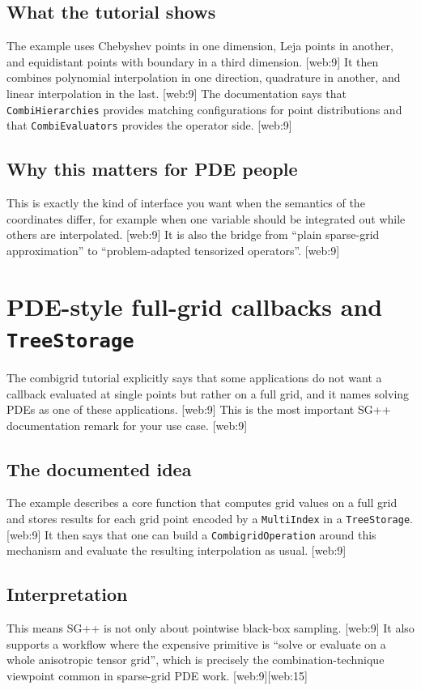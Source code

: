\documentclass[11pt,a4paper]{article}
\begin{document}
\subsection{What the tutorial shows}
The example uses Chebyshev points in one dimension, Leja points in another, and equidistant points with boundary in a third dimension. [web:9]  
It then combines polynomial interpolation in one direction, quadrature in another, and linear interpolation in the last. [web:9]  
The documentation says that \texttt{CombiHierarchies} provides matching configurations for point distributions and that \texttt{CombiEvaluators} provides the operator side. [web:9]  

\subsection{Why this matters for PDE people}
This is exactly the kind of interface you want when the semantics of the coordinates differ, for example when one variable should be integrated out while others are interpolated. [web:9]  
It is also the bridge from ``plain sparse-grid approximation'' to ``problem-adapted tensorized operators''. [web:9]  

\section{PDE-style full-grid callbacks and \texttt{TreeStorage}}

The combigrid tutorial explicitly says that some applications do not want a callback evaluated at single points but rather on a full grid, and it names solving PDEs as one of these applications. [web:9]  
This is the most important SG++ documentation remark for your use case. [web:9]  

\subsection{The documented idea}
The example describes a core function that computes grid values on a full grid and stores results for each grid point encoded by a \texttt{MultiIndex} in a \texttt{TreeStorage}. [web:9]  
It then says that one can build a \texttt{CombigridOperation} around this mechanism and evaluate the resulting interpolation as usual. [web:9]  

\subsection{Interpretation}
This means SG++ is not only about pointwise black-box sampling. [web:9]  
It also supports a workflow where the expensive primitive is ``solve or evaluate on a whole anisotropic tensor grid'', which is precisely the combination-technique viewpoint common in sparse-grid PDE work. [web:9][web:15]  
\end{document}
